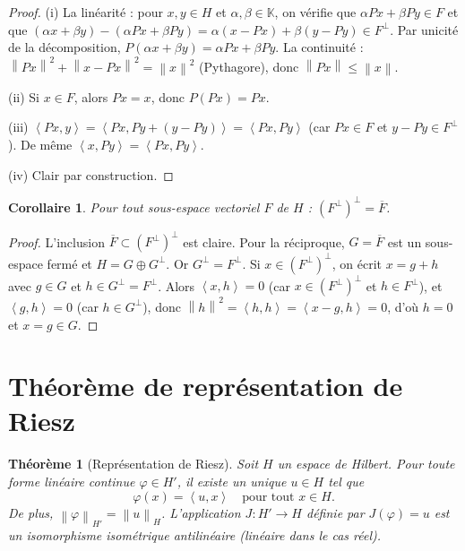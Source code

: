 \documentclass[a4paper,12pt]{book}
\newcommand{\K}{\mathbb{K}}
\newcommand{\norm}[1]{\left\| #1 \right\|}
\newcommand{\inner}[2]{\left\langle #1, #2 \right\rangle}
\theoremstyle{definition}
\theoremstyle{plain}
\newtheorem{theoreme}[definition]{Théorème}
\newtheorem{corollaire}[definition]{Corollaire}
\theoremstyle{remark}
\begin{document}
\begin{proof}
(i) La linéarité : pour $x, y \in H$ et $\alpha, \beta \in \K$, on vérifie que $\alpha Px + \beta Py \in F$ et que $(\alpha x + \beta y) - (\alpha Px + \beta Py) = \alpha(x - Px) + \beta(y - Py) \in F^\perp$. Par unicité de la décomposition, $P(\alpha x + \beta y) = \alpha Px + \beta Py$. La continuité : $\norm{Px}^2 + \norm{x - Px}^2 = \norm{x}^2$ (Pythagore), donc $\norm{Px} \leq \norm{x}$.

(ii) Si $x \in F$, alors $Px = x$, donc $P(Px) = Px$.

(iii) $\inner{Px}{y} = \inner{Px}{Py + (y - Py)} = \inner{Px}{Py}$ (car $Px \in F$ et $y - Py \in F^\perp$). De même $\inner{x}{Py} = \inner{Px}{Py}$.

(iv) Clair par construction.
\end{proof}

\begin{corollaire}\label{cor:biorthogonal}
Pour tout sous-espace vectoriel $F$ de $H$ : $(F^\perp)^\perp = \overline{F}$.
\end{corollaire}

\begin{proof}
L'inclusion $\overline{F} \subset (F^\perp)^\perp$ est claire. Pour la réciproque, $G = \overline{F}$ est un sous-espace fermé et $H = G \oplus G^\perp$. Or $G^\perp = F^\perp$. Si $x \in (F^\perp)^\perp$, on écrit $x = g + h$ avec $g \in G$ et $h \in G^\perp = F^\perp$. Alors $\inner{x}{h} = 0$ (car $x \in (F^\perp)^\perp$ et $h \in F^\perp$), et $\inner{g}{h} = 0$ (car $h \in G^\perp$), donc $\norm{h}^2 = \inner{h}{h} = \inner{x-g}{h} = 0$, d'où $h = 0$ et $x = g \in G$.
\end{proof}

\section{Théorème de représentation de Riesz}

\begin{theoreme}[Représentation de Riesz]\label{thm:riesz-representation}
Soit $H$ un espace de Hilbert. Pour toute forme linéaire continue $\varphi \in H'$, il existe un unique $u \in H$ tel que
\[
    \varphi(x) = \inner{u}{x} \quad \text{pour tout } x \in H.
\]
De plus, $\norm{\varphi}_{H'} = \norm{u}_H$. L'application $J : H' \to H$ définie par $J(\varphi) = u$ est un isomorphisme isométrique antilinéaire (linéaire dans le cas réel).
\end{theoreme}
\end{document}
